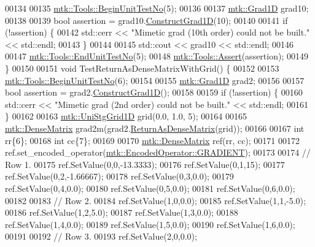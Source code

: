 \begin{DoxyCode}
00134 
00135   \hyperlink{classmtk_1_1Tools_afc29ecaf337a13ed2e817d3890a5a441}{mtk::Tools::BeginUnitTestNo}(5);
00136 
00137   \hyperlink{classmtk_1_1Grad1D}{mtk::Grad1D} grad10;
00138 
00139   \textcolor{keywordtype}{bool} assertion = grad10.\hyperlink{classmtk_1_1Grad1D_a74ef5245cfae6fd158bd7f563a0c2e52}{ConstructGrad1D}(10);
00140 
00141   \textcolor{keywordflow}{if} (!assertion) \{
00142     std::cerr << \textcolor{stringliteral}{"Mimetic grad (10th order) could not be built."} << std::endl;
00143   \}
00144 
00145   std::cout << grad10 << std::endl;
00146 
00147   \hyperlink{classmtk_1_1Tools_aba67d9dc35c9c1c49430fcc9ea035e03}{mtk::Tools::EndUnitTestNo}(5);
00148   \hyperlink{classmtk_1_1Tools_ac6804df469c94ab6a796fb64f1e44a89}{mtk::Tools::Assert}(assertion);
00149 \}
00150 
00151 \textcolor{keywordtype}{void} TestReturnAsDenseMatrixWithGrid() \{
00152 
00153   \hyperlink{classmtk_1_1Tools_afc29ecaf337a13ed2e817d3890a5a441}{mtk::Tools::BeginUnitTestNo}(6);
00154 
00155   \hyperlink{classmtk_1_1Grad1D}{mtk::Grad1D} grad2;
00156 
00157   \textcolor{keywordtype}{bool} assertion = grad2.\hyperlink{classmtk_1_1Grad1D_a74ef5245cfae6fd158bd7f563a0c2e52}{ConstructGrad1D}();
00158 
00159   \textcolor{keywordflow}{if} (!assertion) \{
00160     std::cerr << \textcolor{stringliteral}{"Mimetic grad (2nd order) could not be built."} << std::endl;
00161   \}
00162 
00163   \hyperlink{classmtk_1_1UniStgGrid1D}{mtk::UniStgGrid1D} grid(0.0, 1.0, 5);
00164 
00165   \hyperlink{classmtk_1_1DenseMatrix}{mtk::DenseMatrix} grad2m(grad2.\hyperlink{classmtk_1_1Grad1D_a77b2eddbe4ab03f469306c604d505b1a}{ReturnAsDenseMatrix}(grid));
00166 
00167   \textcolor{keywordtype}{int} rr\{6\};
00168   \textcolor{keywordtype}{int} cc\{7\};
00169 
00170   \hyperlink{classmtk_1_1DenseMatrix}{mtk::DenseMatrix} ref(rr, cc);
00171 
00172   ref.set\_encoded\_operator(\hyperlink{namespacemtk_ga9b50023bfb2692219d2915feade94f80a90f70ea2675c36bd9b0b44a79f37a41f}{mtk::EncodedOperator::GRADIENT});
00173 
00174   \textcolor{comment}{// Row 1.}
00175   ref.SetValue(0,0,-13.3333);
00176   ref.SetValue(0,1,15);
00177   ref.SetValue(0,2,-1.66667);
00178   ref.SetValue(0,3,0.0);
00179   ref.SetValue(0,4,0.0);
00180   ref.SetValue(0,5,0.0);
00181   ref.SetValue(0,6,0.0);
00182 
00183   \textcolor{comment}{// Row 2.}
00184   ref.SetValue(1,0,0.0);
00185   ref.SetValue(1,1,-5.0);
00186   ref.SetValue(1,2,5.0);
00187   ref.SetValue(1,3,0.0);
00188   ref.SetValue(1,4,0.0);
00189   ref.SetValue(1,5,0.0);
00190   ref.SetValue(1,6,0.0);
00191 
00192   \textcolor{comment}{// Row 3.}
00193   ref.SetValue(2,0,0.0);

\end{DoxyCode}

